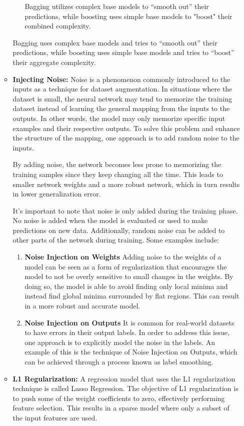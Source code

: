 \begin{itemize}
\begin{itemize}
\begin{itemize}
        Bagging utilizes complex base models to “smooth out” their predictions, while boosting uses simple base models to "boost" their combined complexity.
    \end{itemize}
    Bagging uses complex base models and tries to “smooth out” their predictions, while boosting uses simple base models and tries to “boost” their aggregate complexity.\\
    \item \textbf{Injecting Noise: } Noise is a phenomenon commonly introduced to the inputs as a technique for dataset augmentation. In situations where the dataset is small, the neural network may tend to memorize the training dataset instead of learning the general mapping from the inputs to the outputs. In other words, the model may only memorize specific input examples and their respective outputs. To solve this problem and enhance the structure of the mapping, one approach is to add random noise to the inputs.

    By adding noise, the network becomes less prone to memorizing the training samples since they keep changing all the time. This leads to smaller network weights and a more robust network, which in turn results in lower generalization error.
    
    It's important to note that noise is only added during the training phase. No noise is added when the model is evaluated or used to make predictions on new data. Additionally, random noise can be added to other parts of the network during training. Some examples include:
    
    \begin{enumerate}
        \item \textbf{Noise Injection on Weights} Adding noise to the weights of a model can be seen as a form of regularization that encourages the model to not be overly sensitive to small changes in the weights. By doing so, the model is able to avoid finding only local minima and instead find global minima surrounded by flat regions. This can result in a more robust and accurate model.
        \item \textbf{Noise Injection on Outputs}  It is common for real-world datasets to have errors in their output labels. In order to address this issue, one approach is to explicitly model the noise in the labels. An example of this is the technique of Noise Injection on Outputs, which can be achieved through a process known as label smoothing.
    \end{enumerate}
    \item \textbf{L1 Regularization: } A regression model that uses the L1 regularization technique is called Lasso Regression. The objective of L1 regularization is to push some of the weight coefficients to zero, effectively performing feature selection. This results in a sparse model where only a subset of the input features are used. \cite{kukavcka2017regularization}


\end{itemize}
\end{itemize}
